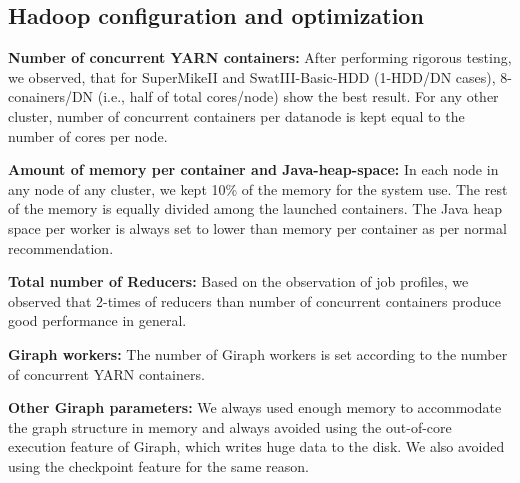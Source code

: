 \documentclass[journal]{IEEEtran}
\begin{document}
\subsection{Hadoop configuration and optimization} 
\textbf{Number of concurrent YARN containers:} After performing rigorous testing,  we observed, that for SuperMikeII and SwatIII-Basic-HDD (1-HDD/DN cases), 8-conainers/DN (i.e., half of total cores/node) show the best result. For any other cluster, number of concurrent containers per datanode is kept equal to the number of cores per node. 

\textbf{Amount of memory per container and Java-heap-space:} In each node in any node of any cluster, we kept 10\% of the memory for the system use. The rest of the memory is equally divided among the launched containers. The Java heap space per worker is always set to lower than memory per container as per normal recommendation.

\textbf{Total number of Reducers:} Based on the observation of job profiles, we observed that 2-times of reducers than number of concurrent containers produce good performance in general. 

\textbf{Giraph workers:} The number of Giraph workers is set according to the number of concurrent YARN containers.

\textbf{Other Giraph parameters:} We always used enough memory to accommodate the graph structure in memory and always avoided using the out-of-core execution feature of Giraph, which writes huge data to the disk. We also avoided using the checkpoint feature for the same reason.
\end{document}
